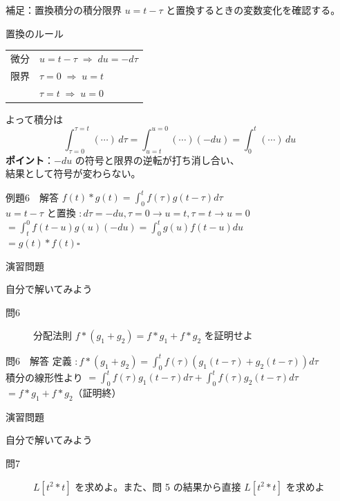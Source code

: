 \documentclass[professionalfonts]{beamer}
\begin{document}
\begin{frame}{補足：置換積分の積分限界}
  $u = t - \tau$ と置換するときの変数変化を確認する。\\[6pt]
  \begin{block}{置換のルール}
  \begin{tabular}{ll}
    微分 & $u = t-\tau \;\Rightarrow\; du = -d\tau$ \\[4pt]
    限界 & $\tau = 0 \;\Rightarrow\; u = t$ \\
         & $\tau = t \;\Rightarrow\; u = 0$
  \end{tabular}
  \end{block}
  \vspace{4pt}
  よって積分は
  \[
    \int_{\tau=0}^{\tau=t} (\cdots)\,d\tau
    = \int_{u=t}^{u=0} (\cdots)(-du)
    = \int_{0}^{t} (\cdots)\,du
  \]
  \textbf{ポイント}：$-du$ の符号と限界の逆転が打ち消し合い、\\
  結果として符号が変わらない。
\end{frame}

\begin{frame}{例題6　解答}
  $f(t)*g(t) = \int_{0}^t f(\tau)g(t-\tau)d\tau$\\[4pt]
  $u = t-\tau$ と置換 $: d\tau = -du, \tau=0 \to u=t, \tau=t \to u=0$\\[4pt]
  $= \int_{t}^0 f(t-u)g(u)(-du) = \int_{0}^t g(u)f(t-u)du$\\[4pt]
  $= g(t)*f(t)$\hfill$\square$
\end{frame}

\begin{frame}{演習問題}
  \begin{exampleblock}{自分で解いてみよう}
  \begin{description}
    \item[問6] 分配法則 $f*(g_{1}+g_{2}) = f*g_{1} + f*g_{2}$ を証明せよ
  \end{description}
  \end{exampleblock}
\end{frame}

\begin{frame}{問6　解答}
  定義 $: f*(g_{1}+g_{2}) = \int_{0}^t f(\tau)(g_{1}(t-\tau)+g_{2}(t-\tau))d\tau$\\[4pt]
  積分の線形性より $= \int_{0}^t f(\tau)g_{1}(t-\tau)d\tau + \int_{0}^t f(\tau)g_{2}(t-\tau)d\tau$\\[4pt]
  $= f*g_{1} + f*g_{2}$（証明終）
\end{frame}

\begin{frame}{演習問題}
  \begin{exampleblock}{自分で解いてみよう}
  \begin{description}
    \item[問7] $L[t^{2}*t]$ を求めよ。また、問 5 の結果から直接 $L[t^{2}*t]$ を求めよ
  \end{description}
  \end{exampleblock}
\end{frame}
\end{document}
